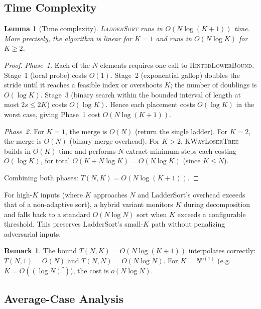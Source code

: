 \documentclass{ieeeaccess}
\theoremstyle{plain}
\newtheorem{lemma}[theorem]{Lemma}
\theoremstyle{definition}
\newtheorem{remark}{Remark}[section]
\begin{document}
\subsection{Time Complexity}
\label{sec:timecomplexity}

\begin{lemma}[Time complexity]
\label{lem:complexity}
\textsc{LadderSort} runs in $O(N\log(K+1))$ time. More precisely, the algorithm is linear for $K=1$ and runs in $O(N\log K)$ for $K \ge 2$.
\end{lemma}

\begin{proof}
\emph{Phase~1.}  Each of the $N$ elements requires one call to
\textsc{HintedLowerBound}.  Stage~1 (local probe) costs $O(1)$.
Stage~2 (exponential gallop) doubles the stride until it reaches a
feasible index or overshoots $K$; the number of doublings is
$O(\log K)$.  Stage~3 (binary search within the bounded interval of
length at most $2s \le 2K$) costs $O(\log K)$.  Hence each placement
costs $O(\log K)$ in the worst case, giving Phase~1 cost $O(N \log(K+1))$.

\emph{Phase~2.}  For $K = 1$, the merge is $O(N)$ (return the single ladder).
For $K = 2$, the merge is $O(N)$ (binary merge overhead).  For $K > 2$, \textsc{KWayLoserTree} builds in $O(K)$ time
and performs $N$ extract-minimum steps each costing $O(\log K)$, for
total $O(K + N\log K) = O(N\log K)$ (since $K \le N$).

Combining both phases: $T(N, K) = O(N\log(K+1))$.
\end{proof}

For high-$K$ inputs (where $K$ approaches $N$ and LadderSort's overhead exceeds that of a non-adaptive sort), a hybrid variant monitors $K$ during decomposition and falls back to a standard $O(N\log N)$ sort when $K$
exceeds a configurable threshold.  This preserves LadderSort's small-$K$ path without penalizing adversarial inputs.


\begin{remark}
The bound $T(N,K)=O(N\log(K+1))$ interpolates correctly: $T(N,1)=O(N)$ and $T(N,N)=O(N\log N)$.  For $K = N^{o(1)}$ (e.g.\ $K = O((\log N)^c)$),
the cost is $o(N \log N)$.
\end{remark}


\subsection{Average-Case Analysis}
\label{sec:avgcase}
\end{document}
